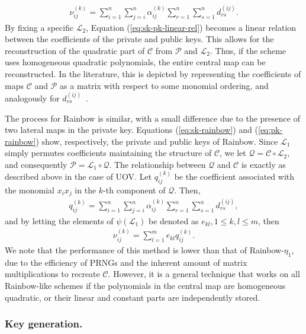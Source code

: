 \documentclass[12pt, a4paper, oneside]{memoir}
\theoremstyle{definition}
\begin{document}
\begin{align}\label{eq:sk-pk-linear-rel}
  \nu_{ij}^{(k)} = \sum_{i = 1}^{n} \sum_{j = i}^{n} \alpha_{ij}^{(k)} \sum_{r = 1}^{n} \sum_{s = 1}^{n} d_{rs}^{(ij)}.
\end{align}
By fixing a specific $\mathcal{L}_{2}$, Equation (\ref{eq:sk-pk-linear-rel}) becomes a linear relation between the coefficients of the private and public keys. This allows for the reconstruction of the quadratic part of $\mathcal{C}$ from $\mathcal{P}$ and $\mathcal{L}_{2}$. Thus, if the scheme uses homogeneous quadratic polynomials, the entire central map can be reconstructed. In the literature, this is depicted by representing the coefficients of maps $\mathcal{C}$ and $\mathcal{P}$ as a matrix with respect to some monomial ordering, and analogously for $d_{rs}^{(ij)}$~\cite[p.~94]{Petzoldt:201307}.

The process for Rainbow is similar, with a small difference due to the presence of two lateral maps in the private key. Equations (\ref{eq:sk-rainbow}) and (\ref{eq:pk-rainbow}) show, respectively, the private and public keys of Rainbow. Since $\mathcal{L}_{1}$ simply permutes coefficients maintaining the structure of $\mathcal{C}$, we let $\mathcal{Q} = \mathcal{C} \circ \mathcal{L}_{2}$, and consequently $\mathcal{P} = \mathcal{L}_{1} \circ \mathcal{Q}$. The relationship between $\mathcal{Q}$ and $\mathcal{C}$ is exactly as described above in the case of UOV. Let $q_{ij}^{(k)}$ be the coefficient associated with the monomial $x_{i} x_{j}$ in the $k$-th component of $\mathcal{Q}$. Then,
\begin{align}
  q_{ij}^{(k)} = \sum_{i = 1}^{n} \sum_{j = i}^{n} \alpha_{ij}^{(k)} \sum_{r = 1}^{n} \sum_{s = 1}^{n} d_{rs}^{(ij)},
\end{align}
and by letting the elements of $\psi(\mathcal{L}_{1})$ be denoted as $e_{kl}, 1 \leq k, l \leq m$, then
\begin{align}
  \nu_{ij}^{(k)} = \sum_{l = 1}^{m} e_{kl} q_{ij}^{(k)}.
\end{align}
We note that the performance of this method is lower than that of Rainbow-$\eta_{1}$, due to the efficiency of PRNGs and the inherent amount of matrix multiplications to recreate $\mathcal{C}$. However, it is a general technique that works on all Rainbow-like schemes if the polynomials in the central map are homogeneous quadratic, or their linear and constant parts are independently stored.

\subsubsection{Key generation.}
\end{document}
